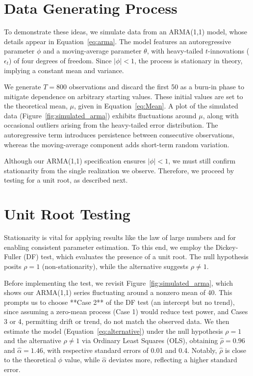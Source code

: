 \documentclass[a4paper,12pt]{article}
\begin{document}
\section{Data Generating Process}
To demonstrate these ideas, we simulate data from an ARMA(1,1) model, whose details appear in Equation~\ref{eq:arma}. The model features an autoregressive parameter \(\phi\) and a moving-average parameter \(\theta\), with heavy-tailed \(t\)-innovations (\(\epsilon_t\)) of four degrees of freedom. Since \(\lvert \phi \rvert < 1\), the process is stationary in theory, implying a constant mean and variance.

We generate \(T = 800\) observations and discard the first 50 as a burn-in phase to mitigate dependence on arbitrary starting values. These initial values are set to the theoretical mean, \(\mu\), given in Equation~\ref{eq:Mean}. A plot of the simulated data (Figure~\ref{fig:simulated_arma}) exhibits fluctuations around \(\mu\), along with occasional outliers arising from the heavy-tailed error distribution. The autoregressive term introduces persistence between consecutive observations, whereas the moving-average component adds short-term random variation.

Although our ARMA(1,1) specification ensures \(\lvert \phi \rvert < 1\), we must still confirm stationarity from the single realization we observe. Therefore, we proceed by testing for a unit root, as described next.

\section{Unit Root Testing}
\label{unitroot}
Stationarity is vital for applying results like the law of large numbers and for enabling consistent parameter estimation. To this end, we employ the Dickey-Fuller (DF) test, which evaluates the presence of a unit root. The null hypothesis posits \(\rho = 1\) (non-stationarity), while the alternative suggests \(\rho \neq 1\).

Before implementing the test, we revisit Figure~\ref{fig:simulated_arma}, which shows our ARMA(1,1) series fluctuating around a nonzero mean of 40. This prompts us to choose **Case 2** of the DF test (an intercept but no trend), since assuming a zero-mean process (Case 1) would reduce test power, and Cases 3 or 4, permitting drift or trend, do not match the observed data. We then estimate the model (Equation~\ref{eq:alternative}) under the null hypothesis \(\rho = 1\) and the alternative \(\rho \neq 1\) via Ordinary Least Squares (OLS), obtaining \(\hat{\rho} = 0.96\) and \(\hat{\alpha} = 1.46\), with respective standard errors of 0.01 and 0.4. Notably, \(\hat{\rho}\) is close to the theoretical \(\phi\) value, while \(\hat{\alpha}\) deviates more, reflecting a higher standard error.
\end{document}
